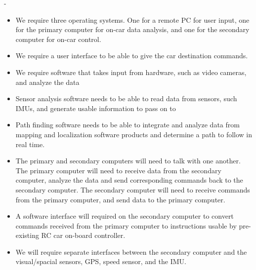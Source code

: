 -\documentclass[compsoc,draftclsnofoot,onecolumn,10pt]{IEEEtran}
\begin{document}
\begin{itemize}
	
	\item We require three operating systems. One for a remote PC for user input, one
	for the primary computer for on-car data analysis, and one for the secondary
	computer for on-car control.
	
	\item We require a user interface to be able to give the car destination commands. 
	
	\item We require software that takes input from hardware, such as video cameras,
	and analyze the data 
	
	\item Sensor analysis software needs to be able to read data from sensors, such IMUs, and generate usable information to pass on to 
	
	\item Path finding software needs to be able to integrate and analyze data from mapping and localization software products and determine a path to follow in real time.
	
	\item The primary and secondary computers will need to talk with one another. The
	primary computer will need to receive data from the secondary computer,
	analyze the data and send corresponding commands back to the secondary
	computer. The secondary computer will need to receive commands from the
	primary computer, and send data to the primary computer.
	
	\item A software interface will required on the secondary computer to convert
	commands received from the primary computer to instructions usable by
	pre-existing RC car on-board controller.
	
	\item We will require separate interfaces between the secondary computer and the
	visual/spacial sensors, GPS, speed sensor, and the IMU. 
	
\end{itemize}
\end{document}
